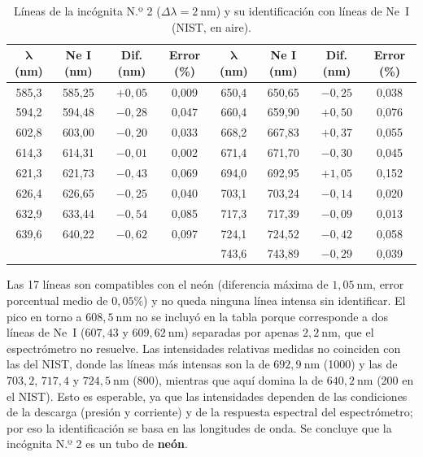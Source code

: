 \documentclass{article}
\newcommand{\nm}{\ \mathrm{nm}}
\begin{document}
\begin{table}[H]
\centering\small
\caption{Líneas de la incógnita N.º 2 ($\Delta\lambda=2\nm$) y su identificación con líneas de Ne~I (NIST, en aire).}
\label{tab:neon}
\begin{tabular}{@{}cccc@{\hspace{1.2cm}}cccc@{}}
\toprule
$\boldsymbol{\lambda}$ \textbf{(nm)} & \textbf{Ne I (nm)} & \textbf{Dif. (nm)} & \textbf{Error (\%)} &
$\boldsymbol{\lambda}$ \textbf{(nm)} & \textbf{Ne I (nm)} & \textbf{Dif. (nm)} & \textbf{Error (\%)}\\
\midrule
585,3 & 585,25 & $+0,05$ & 0,009 & 650,4 & 650,65 & $-0,25$ & 0,038\\
594,2 & 594,48 & $-0,28$ & 0,047 & 660,4 & 659,90 & $+0,50$ & 0,076\\
602,8 & 603,00 & $-0,20$ & 0,033 & 668,2 & 667,83 & $+0,37$ & 0,055\\
614,3 & 614,31 & $-0,01$ & 0,002 & 671,4 & 671,70 & $-0,30$ & 0,045\\
621,3 & 621,73 & $-0,43$ & 0,069 & 694,0 & 692,95 & $+1,05$ & 0,152\\
626,4 & 626,65 & $-0,25$ & 0,040 & 703,1 & 703,24 & $-0,14$ & 0,020\\
632,9 & 633,44 & $-0,54$ & 0,085 & 717,3 & 717,39 & $-0,09$ & 0,013\\
639,6 & 640,22 & $-0,62$ & 0,097 & 724,1 & 724,52 & $-0,42$ & 0,058\\
      &        &         &       & 743,6 & 743,89 & $-0,29$ & 0,039\\
\bottomrule
\end{tabular}
\end{table}

Las 17 líneas son compatibles con el neón (diferencia máxima de $1,05\nm$, error porcentual medio de $0,05\%$) y no queda ninguna línea intensa sin identificar. El pico en torno a $608,5\nm$ no se incluyó en la tabla porque corresponde a dos líneas de Ne~I ($607,43$ y $609,62\nm$) separadas por apenas $2,2\nm$, que el espectrómetro no resuelve. Las intensidades relativas medidas no coinciden con las del NIST, donde las líneas más intensas son la de $692,9\nm$ (1000) y las de $703,2$, $717,4$ y $724,5\nm$ (800), mientras que aquí domina la de $640,2\nm$ (200 en el NIST). Esto es esperable, ya que las intensidades dependen de las condiciones de la descarga (presión y corriente) y de la respuesta espectral del espectrómetro; por eso la identificación se basa en las longitudes de onda. Se concluye que la incógnita N.º 2 es un tubo de \textbf{neón}.
\end{document}
